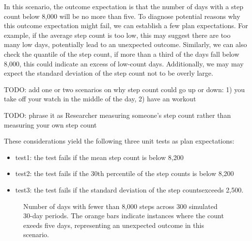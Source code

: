 \documentclass[
]{jds}
\providecommand{\tightlist}{%
  \setlength{\itemsep}{0pt}\setlength{\parskip}{0pt}}\usepackage{longtable,booktabs,array}
\begin{document}
In this scenario, the outcome expectation is that the number of days
with a step count below 8,000 will be no more than five. To diagnose
potential reasons why this outcome expectation might fail, we can
establish a few plan expectations. For example, if the average step
count is too low, this may suggest there are too many low days,
potentially lead to an unexpected outcome. Similarly, we can also check
the quantile of the step count, if more than a third of the days fall
below 8,000, this could indicate an excess of low-count days.
Additionally, we may may expect the standard deviation of the step count
not to be overly large.

TODO: add one or two scenarios on why step count could go up or down: 1)
you take off your watch in the middle of the day, 2) have an workout

TODO: phrase it as Researcher measuring someone's step count rather than
measuring your own step count

These considerations yield the following three unit tests as plan
expectations:

\begin{itemize}
\tightlist
\item
  test1: the test fails if the mean step count is below 8,200
\item
  test2: the test fails if the 30th percentile of the step counts is
  below 8,200
\item
  test3: the test fails if the standard deviation of the step
  countsexceeds 2,500.
\end{itemize}

\label{cell-fig-step-count}
\begin{figure}[H]


\caption{\label{fig-step-count}Number of days with fewer than 8,000
steps across 300 simulated 30-day periods. The orange bars indicate
instances where the count exeeds five days, representing an unexpected
outcome in this scenario.}

\end{figure}%
\end{document}
